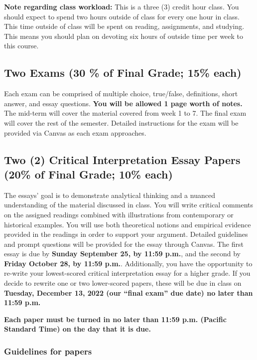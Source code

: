 \documentclass[11pt,]{article}
\begin{document}
\textbf{Note regarding class workload:} This is a three (3) credit hour
class. You should expect to spend two hours outside of class for every
one hour in class. This time outside of class will be spent on reading,
assignments, and studying. This means you should plan on devoting six
hours of outside time per week to this course.

\hypertarget{two-exams-30-of-final-grade-15-each}{%
\subsection{Two Exams (30 \% of Final Grade; 15\%
each)}\label{two-exams-30-of-final-grade-15-each}}

Each exam can be comprised of multiple choice, true/false, definitions,
short answer, and essay questions. \textbf{You will be allowed 1 page
worth of notes.} The mid-term will cover the material covered from week
1 to 7. The final exam will cover the rest of the semester. Detailed
instructions for the exam will be provided via Canvas as each exam
approaches.

\hypertarget{writing_assignments}{%
\subsection{Two (2) Critical Interpretation Essay Papers (20\% of Final
Grade; 10\% each)}\label{writing_assignments}}

The essays' goal is to demonstrate analytical thinking and a nuanced
understanding of the material discussed in class. You will write
critical comments on the assigned readings combined with illustrations
from contemporary or historical examples. You will use both theoretical
notions and empirical evidence provided in the readings in order to
support your argument. Detailed guidelines and prompt questions will be
provided for the essay through Canvas. The first essay is due by
\textbf{Sunday September 25, by 11:59 p.m.}, and the second by
\textbf{Friday October 28, by 11:59 p.m.}. Additionally, you have the
opportunity to re-write your lowest-scored critical interpretation essay
for a higher grade. If you decide to rewrite one or two lower-scored
papers, these will be due in class on \textbf{Tuesday, December 13, 2022
(our ``final exam'' due date) no later than 11:59 p.m.}

\textbf{Each paper must be turned in no later than 11:59 p.m. (Pacific
Standard Time) on the day that it is due.}

\hypertarget{guidelines-for-papers}{%
\subsubsection{Guidelines for papers}\label{guidelines-for-papers}}
\end{document}
